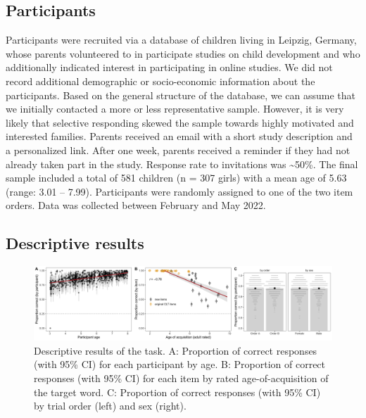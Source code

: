 \documentclass[
  man,floatsintext]{apa6}
\begin{document}
\hypertarget{participants}{%
\subsection{Participants}\label{participants}}

Participants were recruited via a database of children living in Leipzig, Germany, whose parents volunteered to in participate studies on child development and who additionally indicated interest in participating in online studies. We did not record additional demographic or socio-economic information about the participants. Based on the general structure of the database, we can assume that we initially contacted a more or less representative sample. However, it is very likely that selective responding skewed the sample towards highly motivated and interested families. Parents received an email with a short study description and a personalized link. After one week, parents received a reminder if they had not already taken part in the study. Response rate to invitations was \textasciitilde50\%. The final sample included a total of 581 children (n = 307 girls) with a mean age of 5.63 (range: 3.01 -- 7.99). Participants were randomly assigned to one of the two item orders. Data was collected between February and May 2022.

\hypertarget{descriptive-results}{%
\subsection{Descriptive results}\label{descriptive-results}}



\begin{figure}

{\centering \includegraphics[width=1\linewidth]{../graphs/data_fig} 

}

\caption{Descriptive results of the task. A: Proportion of correct responses (with 95\% CI) for each participant by age. B: Proportion of correct responses (with 95\% CI) for each item by rated age-of-acquisition of the target word. C: Proportion of correct responses (with 95\% CI) by trial order (left) and sex (right).}\label{fig:fig2}
\end{figure}
\end{document}
